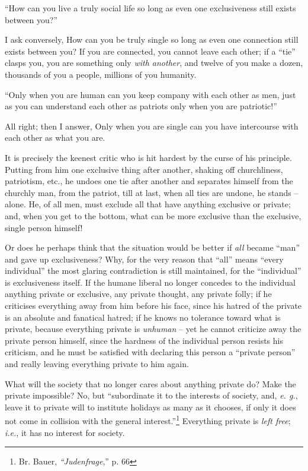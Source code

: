\documentclass[12pt,a4paper]{book}
\begin{document}
``How can you live a truly social life so long as even one exclusiveness 
still exists between you?''

I ask conversely, How can you be truly single so long as even one connection 
still exists between you? If you are connected, you cannot leave each other; 
if a ``tie'' clasps you, you are something only \textit{with another}, and 
twelve of you make a dozen, thousands of you a people, millions of you 
humanity.

``Only when you are human can you keep company with each other as men, just 
as you can understand each other as patriots only when you are patriotic!''

All right; then I answer, Only when you are single can you have intercourse 
with each other as what you are.

It is precisely the keenest critic who is hit hardest by the curse of his 
principle. Putting from him one exclusive thing after another, shaking off 
churchliness, patriotism, etc., he undoes one tie after another and separates 
himself from the churchly man, from the patriot, till at last, when all ties 
are undone, he stands -- alone. He, of all men, must exclude all that have 
anything exclusive or private; and, when you get to the bottom, what can be 
more exclusive than the exclusive, single person himself!

Or does he perhaps think that the situation would be better if \textit{all} 
became ``man'' and gave up exclusiveness? Why, for the very reason that 
``all'' means ``every individual'' the most glaring contradiction is still 
maintained, for the ``individual'' is exclusiveness itself. If the humane 
liberal no longer concedes to the individual anything private or exclusive, 
any private thought, any private folly; if he criticises everything away from 
him before his face, since his hatred of the private is an absolute and 
fanatical hatred; if he knows no tolerance toward what is private, because 
everything private is \textit{unhuman} -- yet he cannot criticize away the 
private person himself, since the hardness of the individual person resists 
his criticism, and he must be satisfied with declaring this person a 
``private person'' and really leaving everything private to him again.

What will the society that no longer cares about anything private do? Make the 
private impossible? No, but ``subordinate it to the interests of society, 
and, \textit{e. g.}, leave it to private will to institute holidays as many as 
it chooses, if only it does not come in collision with the general 
interest.''\footnote{Br. Bauer, \textit{``Judenfrage},'' p. 66} Everything 
private is \textit{left free}; \textit{i.e.}, it has no interest for society.
\end{document}
